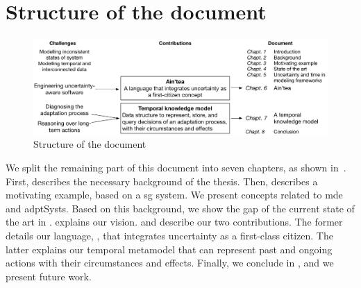 \section{Structure of the document}

\begin{figure}
	\includegraphics[width=\linewidth]{img/chapt-intro/struct/struct}
	\caption{Structure of the document}
	\label{fig:intro:structDoc}
\end{figure}

We split the remaining part of this document into seven chapters, as shown in~.
First,  describes the necessary background of the thesis.
Then,  describes a motivating example, based on a \gls{sg} system.
We present concepts related to \gls{mde} and \glspl{adptSyst}.
Based on this background, we show the gap of the current state of the art in .
 explains our vision.
 and  describe our two contributions.
The former details our language, \langName, that integrates uncertainty as a first-class citizen.
The latter explains our temporal \gls{metamodel} that can represent past and ongoing \glspl{action} with their circumstances and effects.
Finally, we conclude in , and we present future work.